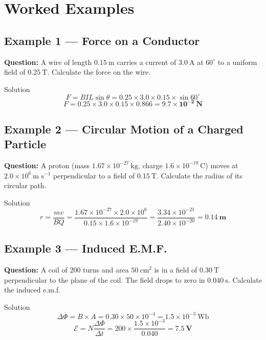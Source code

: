 \section{Worked Examples}

\subsection*{Example 1 — Force on a Conductor}

\textbf{Question:} A wire of length $0.15\ \text{m}$ carries a current of $3.0\ \text{A}$ at $60^\circ$ to a uniform field of $0.25\ \text{T}$. Calculate the force on the wire.

\begin{examplebox}{Solution}
$$F = BIL\sin\theta = 0.25 \times 3.0 \times 0.15 \times \sin 60^\circ$$
$$F = 0.25 \times 3.0 \times 0.15 \times 0.866 = \mathbf{9.7\times10^{-2}\ \text{N}}$$
\end{examplebox}

\subsection*{Example 2 — Circular Motion of a Charged Particle}

\textbf{Question:} A proton (mass $1.67\times10^{-27}\ \text{kg}$, charge $1.6\times10^{-19}\ \text{C}$) moves at $2.0\times10^6\ \text{m s}^{-1}$ perpendicular to a field of $0.15\ \text{T}$. Calculate the radius of its circular path.

\begin{examplebox}{Solution}
$$r = \frac{mv}{BQ} = \frac{1.67\times10^{-27} \times 2.0\times10^6}{0.15 \times 1.6\times10^{-19}} = \frac{3.34\times10^{-21}}{2.40\times10^{-20}} = \mathbf{0.14\ \text{m}}$$
\end{examplebox}

\subsection*{Example 3 — Induced E.M.F.}

\textbf{Question:} A coil of 200 turns and area $50\ \text{cm}^2$ is in a field of $0.30\ \text{T}$ perpendicular to the plane of the coil. The field drops to zero in $0.040\ \text{s}$. Calculate the induced e.m.f.

\begin{examplebox}{Solution}
$$\Delta\Phi = B \times A = 0.30 \times 50\times10^{-4} = 1.5\times10^{-3}\ \text{Wb}$$
$$\mathcal{E} = N\frac{\Delta\Phi}{\Delta t} = 200 \times \frac{1.5\times10^{-3}}{0.040} = \mathbf{7.5\ \text{V}}$$
\end{examplebox}

